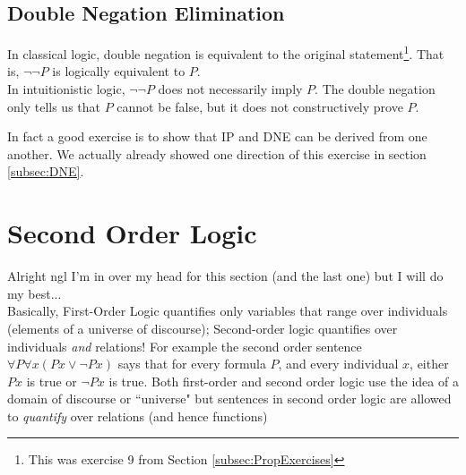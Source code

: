 \subsection{Double Negation Elimination}
In classical logic, double negation is equivalent to the original statement\footnote{This was exercise 9 from Section \ref{subsec:PropExercises}}. That is, $\neg \neg P$ is logically equivalent to $P$. \\

\noindent In intuitionistic logic, $\neg \neg P$ does not necessarily imply $P$. The double negation only tells us that 
$P$ cannot be false, but it does not constructively prove $P$.

In fact a good exercise is to show that IP and DNE can be derived from one another. We actually already showed one direction of this exercise in section \ref{subsec:DNE}.

\section{Second Order Logic}
Alright ngl I'm in over my head for this section (and the last one) but I will do my best...  \\

Basically, First-Order Logic quantifies only variables that range over individuals (elements of a universe of discourse); Second-order logic quantifies over individuals \textit{and} relations! For example the second order sentence $\forall P \forall x (Px\lor \neg Px)$ says that for every formula $P$, and every individual $x$, either $Px$ is true or $\neg Px$ is true. Both first-order and second order logic use the idea of a domain of discourse or ``universe" but sentences in second order logic are allowed to \textit{quantify} over relations (and hence functions)

